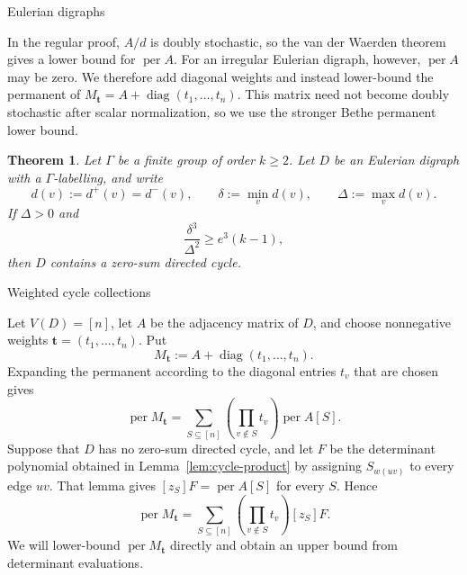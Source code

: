 \documentclass[11pt]{amsart}
\makeatletter
\def\section{\@startsection{section}{1}%
  \z@{1.5\linespacing\@plus.6\linespacing}{.65\linespacing}%
  {\normalfont\Large\bfseries\raggedright}}
\def\subsection{\@startsection{subsection}{2}%
  \z@{1.05\linespacing\@plus.5\linespacing}{.4\linespacing}%
  {\normalfont\large\bfseries\raggedright}}
\newtheorem{theorem}{Theorem}[section]
\theoremstyle{remark}
\newcommand{\per}{\operatorname{per}}
\newcommand{\diag}{\operatorname{diag}}
\makeatother
\begin{document}
\section{Eulerian digraphs}\label{sec:eulerian}

In the regular proof, $A/d$ is doubly stochastic, so the van der Waerden
theorem gives a lower bound for $\per A$.  For an irregular Eulerian
digraph, however, $\per A$ may be zero.  We therefore add diagonal
weights and instead lower-bound the permanent of
$M_{\mathbf t}=A+\diag(t_1,\ldots,t_n)$.  This matrix need not become
doubly stochastic after scalar normalization, so we use the stronger
Bethe permanent lower bound.

\begin{samepage}
\begin{theorem}\label{thm:eulerian}
Let $\Gamma$ be a finite group of order $k\ge2$.  Let $D$ be an
Eulerian digraph with a $\Gamma$-labelling, and write
\[
  d(v):=d^+(v)=d^-(v),\qquad
  \delta:=\min_v d(v),\qquad
  \Delta:=\max_v d(v).
\]
If $\Delta>0$ and
\[
  \frac{\delta^3}{\Delta^2}\ge e^3(k-1),
\]
then $D$ contains a zero-sum directed cycle.
\end{theorem}
\end{samepage}

\subsection{Weighted cycle collections}

Let $V(D)=[n]$, let $A$ be the adjacency matrix of $D$, and choose
nonnegative weights $\mathbf t=(t_1,\ldots,t_n)$.  Put
\[
M_{\mathbf t}:=A+\diag(t_1,\ldots,t_n).
\]
Expanding the permanent according to the diagonal entries $t_v$ that
are chosen gives
\begin{equation}\label{eq:weighted-permanent-expansion}
  \per M_{\mathbf t}
  =
  \sum_{S\subseteq[n]}
  \left(\prod_{v\notin S}t_v\right)\per A[S].
\end{equation}
Suppose that $D$ has no zero-sum directed cycle, and let $F$ be the
determinant polynomial obtained in Lemma~\ref{lem:cycle-product} by
assigning $S_{w(uv)}$ to every edge $uv$.  That lemma gives
$[z_S]F=\per A[S]$ for every $S$.  Hence
\begin{equation}\label{eq:weighted-permanent-determinant}
  \per M_{\mathbf t}
  =
  \sum_{S\subseteq[n]}
  \left(\prod_{v\notin S}t_v\right)[z_S]F.
\end{equation}
We will lower-bound $\per M_{\mathbf t}$ directly and obtain an upper
bound from determinant evaluations.
\end{document}
